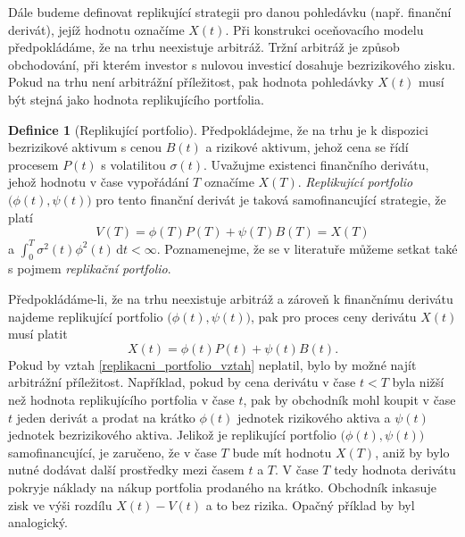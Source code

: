 \documentclass[a4paper,12pt]{report}
\theoremstyle{definition} \newtheorem{definice}[veta]{Definice}
\theoremstyle{remark}
\begin{document}
Dále budeme definovat replikující strategii pro danou pohledávku (např. finanční derivát), jejíž hodnotu označíme $X(t)$.
Při konstrukci oceňovacího modelu předpokládáme, že na trhu neexistuje arbitráž.
Tržní arbitráž je způsob obchodování, při kterém investor s nulovou investicí dosahuje bezrizikového zisku. 
Pokud na trhu není arbitrážní příležitost, pak hodnota pohledávky $X(t)$ musí být stejná jako hodnota replikujícího portfolia.
\begin{definice}[Replikující portfolio]
Předpokládejme, že na trhu je k dispozici bezrizikové aktivum s cenou $B(t)$ a rizikové aktivum, jehož cena se řídí procesem $P(t)$ s volatilitou $\sigma(t)$.
Uvažujme existenci finančního derivátu, jehož hodnotu v čase vypořádání $T$ označíme $X(T)$.
\textit{Replikující portfolio} $\big(\phi(t),\psi(t)\big)$ pro tento finanční derivát je taková samofinancující strategie, že platí
\begin{equation}\label{replikacni_portfolio}
V(T)=\phi(T)P(T)+\psi(T)B(T)=X(T)
\end{equation}
a $\int_0^T\sigma^2(t)\phi^2(t)\,\mathrm{d}t<\infty$.
Poznamenejme, že se v literatuře můžeme setkat také s pojmem \textit{replikační portfolio}.
\end{definice}
Předpokládáme-li, že na trhu neexistuje arbitráž a zároveň k finančnímu derivátu najdeme replikující portfolio $\big(\phi(t),\psi(t)\big)$, pak pro proces ceny derivátu $X(t)$ musí platit
\begin{equation}\label{replikacni_portfolio_vztah}
X(t)=\phi(t)P(t)+\psi(t)B(t).
\end{equation}
Pokud by vztah \eqref{replikacni_portfolio_vztah} neplatil, bylo by možné najít arbitrážní příležitost.
Například, pokud by cena derivátu v čase $t<T$ byla nižší než hodnota replikujícího portfolia v čase $t$, pak by obchodník mohl koupit v čase $t$ jeden derivát a prodat na krátko $\phi(t)$ jednotek rizikového aktiva a $\psi(t)$ jednotek bezrizikového aktiva. 
Jelikož je replikující portfolio $\big(\phi(t),\psi(t)\big)$ samofinancující, je zaručeno, že v čase $T$ bude mít hodnotu $X(T)$, aniž by bylo nutné dodávat další prostředky mezi časem $t$ a $T$.
V čase $T$ tedy hodnota derivátu pokryje náklady na nákup portfolia prodaného na krátko.
Obchodník inkasuje zisk ve výši rozdílu $X(t)-V(t)$ a to bez rizika.
Opačný příklad by byl analogický.
 
\end{document}

